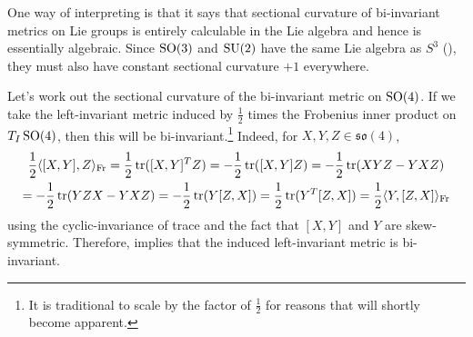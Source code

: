 One way of interpreting  is that it says that sectional curvature of bi-invariant metrics on Lie groups is entirely calculable in the Lie algebra and hence is essentially algebraic. Since $\operatorname{SO}(3)$ and $\operatorname{SU}(2)$ have the same Lie algebra as $S^3$ (), they must also have constant sectional curvature $+1$ everywhere.

\begin{example}
	Let's work out the sectional curvature of the bi-invariant metric on $\operatorname{SO}(4)$. If we take the left-invariant metric induced by $\frac{1}{2}$ times the Frobenius inner product on $T_I \operatorname{SO}(4)$, then this will be bi-invariant.\footnote{It is traditional to scale by the factor of $\frac{1}{2}$ for reasons that will shortly become apparent.} Indeed, for $X,Y,Z \in \mathfrak{so}(4)$,
	\begin{multline*}
		\frac{1}{2}\langle [X,Y],Z \rangle_{\text{Fr}} = \frac{1}{2}\operatorname{tr}([X,Y]^T Z) = -\frac{1}{2} \operatorname{tr}([X,Y]Z) = -\frac{1}{2}\operatorname{tr}(XYZ-YXZ) \\
		= -\frac{1}{2}\operatorname{tr}(YZX-YXZ) = -\frac{1}{2}\operatorname{tr}(Y[Z,X]) = \frac{1}{2}\operatorname{tr}(Y^T [Z,X]) = \frac{1}{2}\langle Y,[Z,X]\rangle_{\text{Fr}}
	\end{multline*}
	using the cyclic-invariance of trace and the fact that $[X,Y]$ and $Y$ are skew-symmetric. Therefore,  implies that the induced left-invariant metric is bi-invariant.
	

\end{example}
